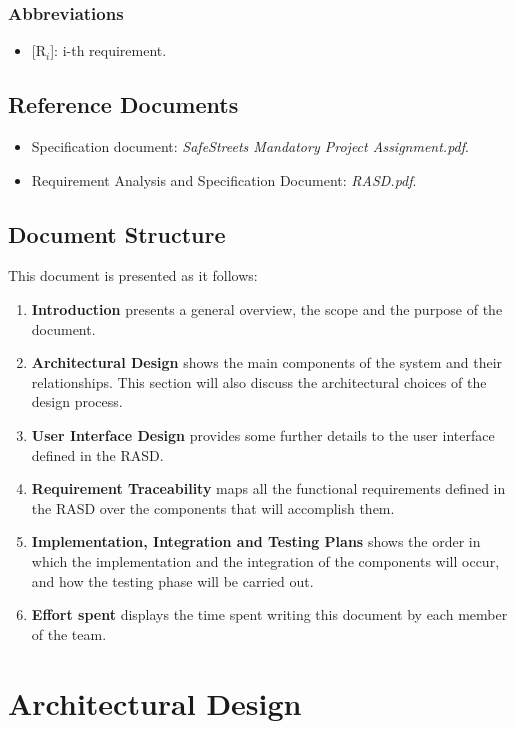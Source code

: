 \documentclass{report}
\begin{document}
\subsection{Abbreviations}
\begin{itemize}
    \item {[R$_{i}$]}: i-th requirement.
    \end{itemize}
\section{Reference Documents}
\begin{itemize}
    \item Specification document: \textit{SafeStreets Mandatory Project Assignment.pdf}.
    \item Requirement Analysis and Specification Document: \textit{RASD.pdf}.
\end{itemize}
\section{Document Structure}
This document is presented as it follows:
\begin{enumerate}
    \item \textbf{Introduction} presents a general overview, the scope and the purpose of the document.
    \item \textbf{Architectural Design} shows the main components of the system and their relationships. This section will also discuss the architectural choices of the design process.
    \item \textbf{User Interface Design} provides some further details to the user interface defined in the RASD.
    \item \textbf{Requirement Traceability} maps all the functional requirements defined in the RASD over the components that will accomplish them.
    \item \textbf{Implementation, Integration and Testing Plans} shows the order in which the implementation and the integration of the components will occur, and how the testing phase will be carried out.
    \item {\textbf{Effort spent}} displays the time spent writing this document by each member of the team.
\end{enumerate}
\chapter{Architectural Design}
\end{document}
